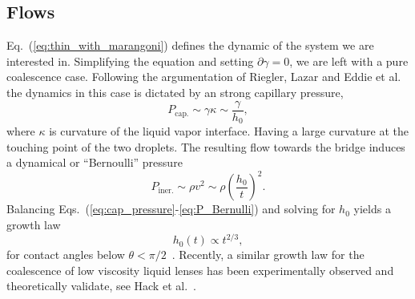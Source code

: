 \documentclass[twocolumn,amsmath,amssymb,showpacs,pre,nofootinbib,superscriptaddress]{revtex4-1} %
\begin{document}
\subsection{Flows}\label{subsec:flows_theory}
Eq.~(\ref{eq:thin_with_marangoni}) defines the dynamic of the system we are interested in.
Simplifying the equation and setting $\partial\gamma = 0$, we are left with a pure coalescence case.
Following the argumentation of Riegler, Lazar and Eddie et al.~\cite{doi:10.1021/la800630w, PhysRevLett.111.144502} the dynamics in this case is dictated by an strong capillary pressure,
\begin{equation}\label{eq:cap_pressure}
    P_{\text{cap.}} \sim\gamma\kappa \sim \frac{\gamma}{h_0},
\end{equation}
where $\kappa$ is curvature of the liquid vapor interface. 
Having a large curvature at the touching point of the two droplets.
The resulting flow towards the bridge induces a dynamical or ``Bernoulli'' pressure
\begin{equation}\label{eq:P_Bernulli}
    P_{\text{iner.}} \sim \rho v^2 \sim \rho\left(\frac{h_0}{t}\right)^2.
\end{equation}
Balancing Eqs.~(\ref{eq:cap_pressure}-\ref{eq:P_Bernulli}) and solving for $h_0$ yields a growth law 
\begin{equation}\label{eq:coal_powerlaw}
    h_0(t) \propto t^{2/3},
\end{equation}
for contact angles below $\theta < \pi/2$~\cite{PhysRevLett.111.144502, keller2002breaking}.
Recently, a similar growth law for the coalescence of low viscosity liquid lenses has been experimentally observed and theoretically validate, see Hack et al.~\cite{PhysRevLett.124.194502}.
\end{document}
